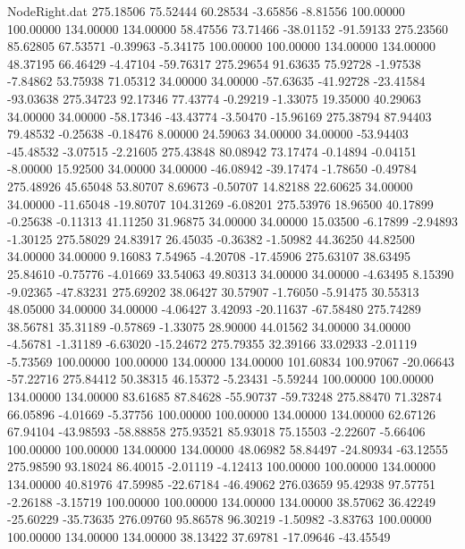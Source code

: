 \begin{filecontents}{NodeRight.dat}
 275.18506   75.52444   60.28534    -3.65856   -8.81556  100.00000  100.00000  134.00000  134.00000   58.47556   73.71466  -38.01152  -91.59133
 275.23560   85.62805   67.53571    -0.39963   -5.34175  100.00000  100.00000  134.00000  134.00000   48.37195   66.46429   -4.47104  -59.76317
 275.29654   91.63635   75.92728    -1.97538   -7.84862   53.75938   71.05312   34.00000   34.00000  -57.63635  -41.92728  -23.41584  -93.03638
 275.34723   92.17346   77.43774    -0.29219   -1.33075   19.35000   40.29063   34.00000   34.00000  -58.17346  -43.43774   -3.50470  -15.96169
 275.38794   87.94403   79.48532    -0.25638   -0.18476    8.00000   24.59063   34.00000   34.00000  -53.94403  -45.48532   -3.07515   -2.21605
 275.43848   80.08942   73.17474    -0.14894   -0.04151   -8.00000   15.92500   34.00000   34.00000  -46.08942  -39.17474   -1.78650   -0.49784
 275.48926   45.65048   53.80707     8.69673   -0.50707   14.82188   22.60625   34.00000   34.00000  -11.65048  -19.80707  104.31269   -6.08201
 275.53976   18.96500   40.17899    -0.25638   -0.11313   41.11250   31.96875   34.00000   34.00000   15.03500   -6.17899   -2.94893   -1.30125
 275.58029   24.83917   26.45035    -0.36382   -1.50982   44.36250   44.82500   34.00000   34.00000    9.16083    7.54965   -4.20708  -17.45906
 275.63107   38.63495   25.84610    -0.75776   -4.01669   33.54063   49.80313   34.00000   34.00000   -4.63495    8.15390   -9.02365  -47.83231
 275.69202   38.06427   30.57907    -1.76050   -5.91475   30.55313   48.05000   34.00000   34.00000   -4.06427    3.42093  -20.11637  -67.58480
 275.74289   38.56781   35.31189    -0.57869   -1.33075   28.90000   44.01562   34.00000   34.00000   -4.56781   -1.31189   -6.63020  -15.24672
 275.79355   32.39166   33.02933    -2.01119   -5.73569  100.00000  100.00000  134.00000  134.00000  101.60834  100.97067  -20.06643  -57.22716
 275.84412   50.38315   46.15372    -5.23431   -5.59244  100.00000  100.00000  134.00000  134.00000   83.61685   87.84628  -55.90737  -59.73248
 275.88470   71.32874   66.05896    -4.01669   -5.37756  100.00000  100.00000  134.00000  134.00000   62.67126   67.94104  -43.98593  -58.88858
 275.93521   85.93018   75.15503    -2.22607   -5.66406  100.00000  100.00000  134.00000  134.00000   48.06982   58.84497  -24.80934  -63.12555
 275.98590   93.18024   86.40015    -2.01119   -4.12413  100.00000  100.00000  134.00000  134.00000   40.81976   47.59985  -22.67184  -46.49062
 276.03659   95.42938   97.57751    -2.26188   -3.15719  100.00000  100.00000  134.00000  134.00000   38.57062   36.42249  -25.60229  -35.73635
 276.09760   95.86578   96.30219    -1.50982   -3.83763  100.00000  100.00000  134.00000  134.00000   38.13422   37.69781  -17.09646  -43.45549

\end{filecontents}
